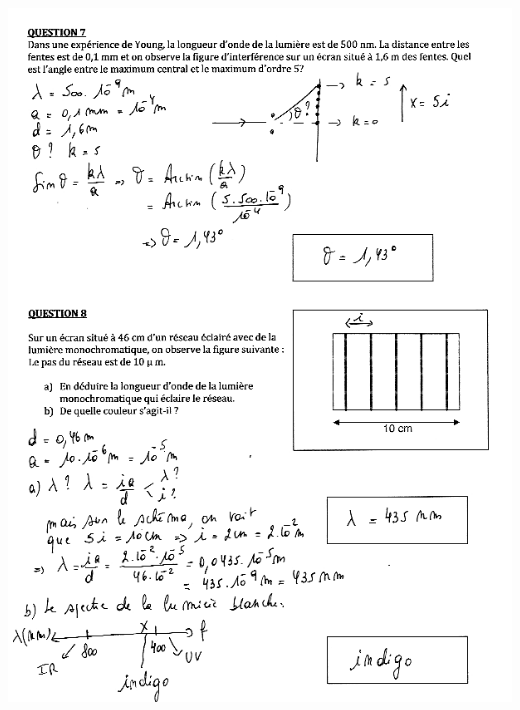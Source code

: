 \includegraphics[width=18.503cm,height=25.456cm]{Pictures/100000010000025F0000034333FCC8788E7659FD.png}


